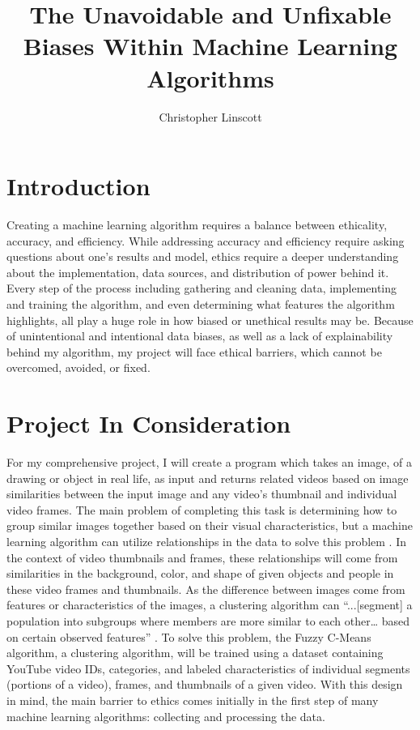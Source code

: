 \documentclass[10pt,twocolumn]{article}
\title{The Unavoidable and Unfixable Biases Within Machine Learning Algorithms}
\author{Christopher Linscott}
\affiliation{Occidental College}
\begin{document}
\maketitle


\section {Introduction}

Creating a machine learning algorithm requires a balance between ethicality, accuracy, and efficiency. While addressing accuracy and efficiency require asking questions about one’s results and model, ethics require a deeper understanding about the implementation, data sources, and distribution of power behind it. Every step of the process including gathering and cleaning data, implementing and training the algorithm, and even determining what features the algorithm highlights, all play a huge role in how biased or unethical results may be. Because of unintentional and intentional data biases, as well as a lack of explainability behind my algorithm, my project will face ethical barriers, which cannot be overcomed, avoided, or fixed.

\section {Project In Consideration}

For my comprehensive project, I will create a program which takes an image, of a drawing or object in real life, as input and returns related videos based on image similarities between the input image and any video’s thumbnail and individual video frames. The main problem of completing this task is determining how to group similar images together based on their visual characteristics, but a machine learning algorithm can utilize relationships in the data to solve this problem \cite{Fuchs2018}. In the context of video thumbnails and frames, these relationships will come from similarities in the background, color, and shape of given objects and people in these video frames and thumbnails. As the difference between images come from features or characteristics of the images, a clustering algorithm can “...[segment] a population into subgroups where members are more similar to each other… based on certain observed features” \cite{C3Clustering}. To solve this problem, the Fuzzy C-Means algorithm, a clustering algorithm, will be trained using a dataset containing YouTube video IDs, categories, and labeled characteristics of individual segments (portions of a video), frames, and thumbnails of a given video. With this design in mind, the main barrier to ethics comes initially in the first step of many machine learning algorithms: collecting and processing the data. 
\end{document}

